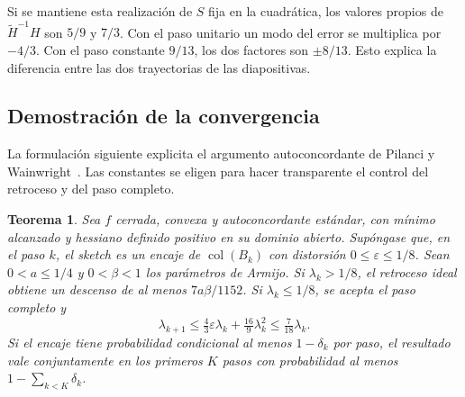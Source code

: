 \documentclass[11pt,a4paper]{article}
\newtheorem{teorema}{Teorema}
\newcommand{\eps}{\varepsilon}
\newcommand{\HS}{\widetilde H}
\DeclareMathOperator{\col}{col}
\begin{document}
Si se mantiene esta realización de $S$ fija en la cuadrática, los valores propios de $\HS^{-1}H$ son $5/9$ y $7/3$. Con el paso unitario un modo del error se multiplica por $-4/3$. Con el paso constante $9/13$, los dos factores son $\pm8/13$. Esto explica la diferencia entre las dos trayectorias de las diapositivas.

\subsection{Demostración de la convergencia}
La formulación siguiente explicita el argumento autoconcordante de Pilanci y Wainwright~\cite[secs.~4.1 y 6.2]{PW17}. Las constantes se eligen para hacer transparente el control del retroceso y del paso completo.
\begin{teorema}\label{th:ns}
Sea $f$ cerrada, convexa y autoconcordante estándar, con mínimo alcanzado y hessiano definido positivo en su dominio abierto. Supóngase que, en el paso $k$, el sketch es un encaje de $\col(B_k)$ con distorsión $0\le\eps\le1/8$. Sean $0<a\le1/4$ y $0<\beta<1$ los parámetros de Armijo. Si $\lambda_k>1/8$, el retroceso ideal obtiene un descenso de al menos $7a\beta/1152$. Si $\lambda_k\le1/8$, se acepta el paso completo y
\begin{equation}
 \lambda_{k+1}\le\tfrac43\eps\lambda_k+\tfrac{16}{9}\lambda_k^2
                 \le\tfrac7{18}\lambda_k.\label{eq:lq}
\end{equation}
Si el encaje tiene probabilidad condicional al menos $1-\delta_k$ por paso, el resultado vale conjuntamente en los primeros $K$ pasos con probabilidad al menos $1-\sum_{k<K}\delta_k$.
\end{teorema}
\end{document}
